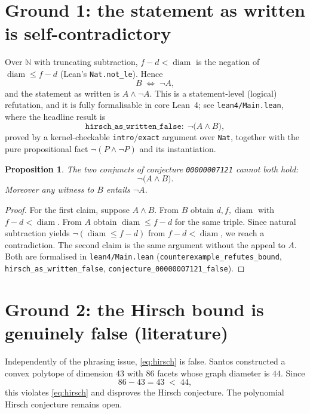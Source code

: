 \documentclass[11pt]{article}
\newtheorem{proposition}[theorem]{Proposition}
\theoremstyle{remark}
\begin{document}
\section{Ground 1: the statement as written is self-contradictory}

Over $\mathbb{N}$ with truncating subtraction, $f - d < \operatorname{diam}$
is the negation of $\operatorname{diam} \le f - d$ (Lean's
\texttt{Nat.not\_le}). Hence
\[
  B \;\Longleftrightarrow\; \lnot A ,
\]
and the statement as written is $A \land \lnot A$. This is a statement-level
(logical) refutation, and it is fully formalisable in core Lean~4; see
\texttt{lean4/Main.lean}, where the headline result is
\[
  \texttt{hirsch\_as\_written\_false}:\;
  \lnot\bigl(A \land B\bigr),
\]
proved by a kernel-checkable \texttt{intro}/\texttt{exact} argument over
\texttt{Nat}, together with the pure propositional fact
$\lnot(P \land \lnot P)$ and its instantiation.

\begin{proposition}\label{prop:logic}
The two conjuncts of conjecture \texttt{00000007121} cannot both hold:
\[
  \lnot\bigl(A \land B\bigr).
\]
Moreover any witness to $B$ entails $\lnot A$.
\end{proposition}

\begin{proof}
For the first claim, suppose $A \land B$. From $B$ obtain
$d, f, \operatorname{diam}$ with $f - d < \operatorname{diam}$. From $A$
obtain $\operatorname{diam} \le f - d$ for the same triple. Since natural
subtraction yields $\lnot(\operatorname{diam} \le f - d)$ from
$f - d < \operatorname{diam}$, we reach a contradiction. The second claim is
the same argument without the appeal to $A$. Both are formalised in
\texttt{lean4/Main.lean} (\texttt{counterexample\_refutes\_bound},
\texttt{hirsch\_as\_written\_false},
\texttt{conjecture\_00000007121\_false}).
\end{proof}

\section{Ground 2: the Hirsch bound is genuinely false (literature)}

Independently of the phrasing issue, \eqref{eq:hirsch} is false. Santos
\cite{Santos2012} constructed a convex polytope of dimension $43$ with $86$
facets whose graph diameter is $44$. Since
\[
  86 - 43 = 43 \;<\; 44,
\]
this violates \eqref{eq:hirsch} and disproves the Hirsch conjecture. The
polynomial Hirsch conjecture remains open.
\end{document}
